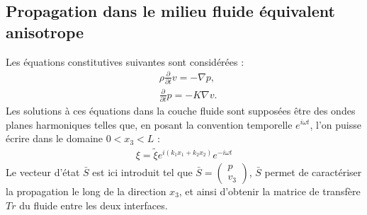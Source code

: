 \documentclass[12pt]{report}
\begin{document}
\subsection{Propagation dans le milieu fluide équivalent anisotrope}
\label{Ch_Prop_S_Pb_SS_Eul}
    Les équations constitutives suivantes sont considérées :
    \begin{align}
	&\rho \frac{\partial}{\partial t}v=-\nabla p,\label{Const1} \\
	&\frac{\partial}{\partial t}p=-K\nabla v.\label{Const2}
    \end{align}
    Les solutions à ces équations dans la couche fluide sont supposées être  des ondes planes harmoniques telles que, en posant la convention temporelle $e^{i\omega t}$, l'on puisse écrire dans le domaine $0<x_3<L$ :
    \begin{align}
        \xi=\tilde{\xi}e^{i(k_1 x_1+k_2 x_2)}e^{-i\omega t}\label{Convention_k_t}
    \end{align}
    Le vecteur d'état $\bar{S}$ est ici introduit tel que $\bar{S}=\begin{pmatrix} p \\ v_3 \end{pmatrix}$, $\bar{S}$ permet de caractériser la propagation le long de la direction $x_3$, et ainsi d'obtenir la matrice de transfère $Tr$ du fluide entre les deux interfaces.
    
\end{document}
